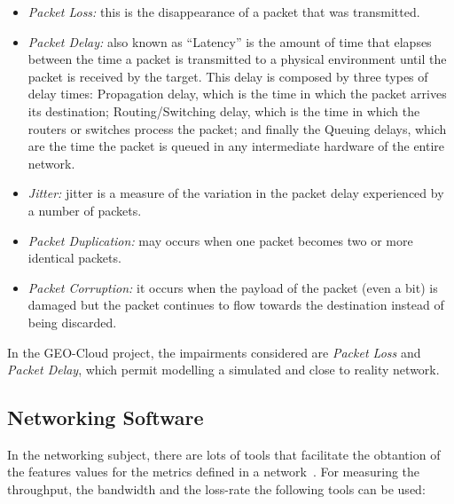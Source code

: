 \begin{itemize}
\item \emph{Packet Loss:} this is the disappearance of a packet that was
  transmitted.
\item \emph{Packet Delay:} also known as ``Latency'' is the amount of time that elapses between the time a
  packet is transmitted to a physical environment until the packet is received by
  the target. This delay is composed by three types of delay times: Propagation
  delay, which is the time in which the packet arrives its destination;
  Routing/Switching delay, which is the time in which the routers or
  switches  process the packet; and finally the Queuing delays, which are
  the time the packet is queued in any intermediate hardware of the entire network.
\item \emph{Jitter:} jitter is a measure of the variation in the packet delay
  experienced by a number of packets.
\item \emph{Packet Duplication:} may occurs when one packet becomes two or more
  identical packets.
\item \emph{Packet Corruption:} it occurs when the payload of the packet (even a bit)
  is damaged but the packet continues to flow towards the destination instead of
  being discarded.
\end{itemize}

In the GEO-Cloud project, the impairments considered are \emph{Packet Loss} and
\emph{Packet Delay}, which permit modelling a simulated and close to reality network.


\subsection{Networking Software}

In the networking subject, there are lots of tools that facilitate the obtantion
of the
features values for the metrics defined in a network~\cite{libroredes}.
For measuring the throughput, the bandwidth and the loss-rate the following
tools can be used:

